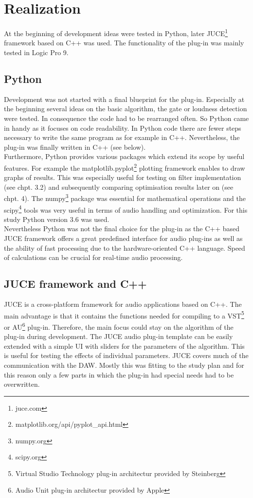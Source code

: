 \chapter{Realization}
\label{chapter:realization}

At the beginning of development ideas were tested in Python, later JUCE\footnote{juce.com} framework based on C++ was used. The functionality of the plug-in was mainly tested in Logic Pro 9.\\

\section{Python}

Development was not started with a final blueprint for the plug-in. Especially at the beginning several ideas on the basic algorithm, the gate or loudness detection were tested. In consequence the code had to be rearranged often. So Python came in handy as it focuses on code readability. In Python code there are fewer steps necessary to write the same program as for example in C++. Nevertheless, the plug-in was finally written in C++ (see below).\\
Furthermore, Python provides various packages which extend its scope by useful features. For example the matplotlib.pyplot\footnote{matplotlib.org/api/pyplot\_api.html} plotting framework enables to draw graphs of results. This was especially useful for testing on filter implementation (see chpt. 3.2) and subsequently comparing optimisation results later on (see chpt. 4). The numpy\footnote{numpy.org} package was essential for mathematical operations and the scipy\footnote{scipy.org} tools was very useful in terms of audio handling and optimization. For this study Python version 3.6 was used.\\
Nevertheless Python was not the final choice for the plug-in as the C++ based JUCE framework offers a great predefined interface for audio plug-ins as well as the ability of fast processing due to the hardware-oriented C++ language. Speed of calculations can be crucial for real-time audio processing.\\

\section{JUCE framework and C++}

JUCE is a cross-platform framework for audio applications based on C++. The main advantage is that it contains the functions needed for compiling to a VST\footnote{Virtual Studio Technology plug-in architectur provided by Steinberg} or AU\footnote{Audio Unit plug-in architectur provided by Apple} plug-in. Therefore, the main focus could stay on the algorithm of the plug-in during development. The JUCE audio plug-in template can be easily extended with a simple UI with sliders for the parameters of the algorithm. This is useful for testing the effects of individual parameters. JUCE covers much of the communication with the DAW. Mostly this was fitting to the study plan and for this reason only a few parts in which the plug-in had special needs had to be overwritten.\\

